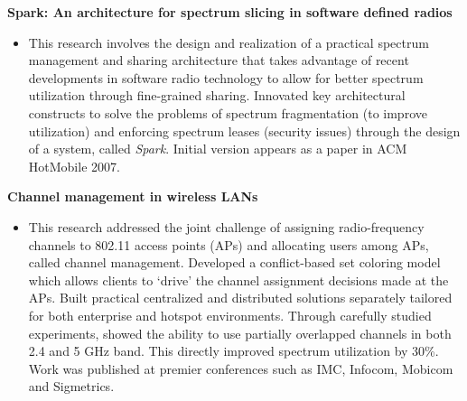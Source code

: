 \begin{resume}
{\bf Spark: An architecture for spectrum slicing in software defined radios}
 \begin{itemize}
 \item [] This research
involves the design and realization of a practical spectrum management and sharing architecture that takes advantage of
recent developments in software radio technology to allow for better spectrum utilization through fine-grained sharing.
Innovated key architectural constructs to solve the problems of spectrum fragmentation (to improve utilization) and
enforcing spectrum leases (security issues) through the design of a system, called {\it Spark}. Initial version appears
as a paper in ACM HotMobile 2007.
 \end{itemize}

{\bf Channel management in wireless LANs}
    \begin{itemize}
	\item [] This research addressed the joint challenge of assigning
	radio-frequency channels to 802.11 access points (APs) and allocating
	users among APs, called channel management. Developed a conflict-based set coloring model which allows clients to `drive' the channel assignment
decisions made at the APs.  Built practical centralized and distributed solutions separately tailored for both enterprise and hotspot
environments. Through carefully studied experiments, showed the ability to use partially overlapped channels in both 2.4
and 5 GHz band. This directly improved spectrum utilization by 30\%.  Work was published at premier conferences such as
IMC, Infocom, Mobicom and Sigmetrics.
    \end{itemize}
\vspace{-0.2cm}


\end{resume}
